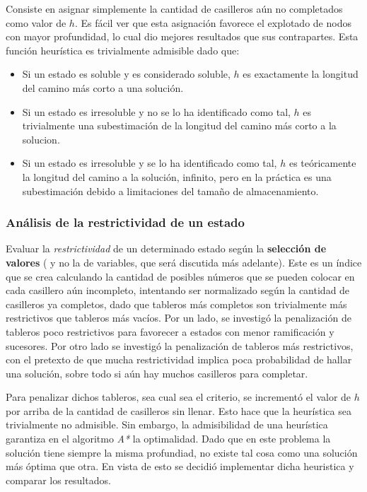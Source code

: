\documentclass[%
    final,
    reprint,
    notitlepage,
    narroweqnarray,
    inline,
    twoside,
    invited
    ]{ieee}
\begin{document}
\par Consiste en asignar simplemente la cantidad de casilleros aún no completados como valor de $h$. Es fácil ver que esta asignación favorece el explotado
 de nodos con mayor profundidad, lo cual dio mejores resultados que sus contrapartes. Esta función heurística es trivialmente admisible dado que:
\begin{itemize}
\item Si un estado es soluble y es considerado soluble, $h$ es exactamente la longitud del camino más corto a una solución.
\item Si un estado es irresoluble y no se lo ha identificado como tal, $h$ es trivialmente una subestimación de la longitud del camino más corto a la solucion.
\item Si un estado es irresoluble y se lo ha identificado como tal, $h$ es teóricamente la longitud del camino a la solución,  infinito, pero en la práctica 
es una subestimación debido a limitaciones del tamaño de almacenamiento.
\end{itemize}

\subsubsection{Análisis de la restrictividad de un estado}

\par Evaluar la \textit{restrictividad} de un determinado estado según la \textbf{selección de valores} ( y no la de variables, que será 
discutida más adelante). Este es un índice que se crea calculando la cantidad de posibles números que se pueden colocar 
en cada casillero aún incompleto, intentando ser normalizado según la cantidad de casilleros ya completos, dado que tableros más completos son trivialmente más 
restrictivos que tableros más vacíos. Por un lado, se investigó la penalización de tableros poco restrictivos para favorecer
 a estados con menor ramificación y sucesores. Por otro lado se investigó la penalización de tableros más restrictivos, con el pretexto de que 
mucha restrictividad implica poca probabilidad de hallar una solución, sobre todo si aún hay muchos casilleros para completar.
\par Para penalizar dichos tableros, sea cual sea el criterio, se incrementó el valor de $h$ por arriba de la cantidad de casilleros sin llenar. Esto hace 
que la heurística sea trivialmente no admisible. Sin embargo, la admisibilidad de una heurística garantiza en el algoritmo \textit{A*} la optimalidad. Dado 
que en este problema la solución tiene siempre la misma profundiad, no existe tal cosa como una solución más óptima que otra. En vista de esto se decidió 
implementar dicha heuristica y comparar los resultados.
\end{document}
